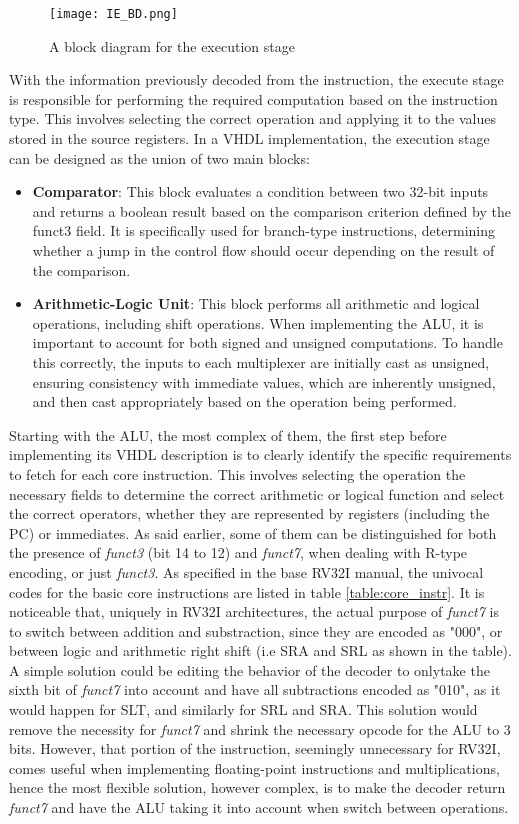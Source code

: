 \begin{figure}[ht]
    \centering
    \texttt{[image: IE\_BD.png]}
    \caption{A block diagram for the execution stage}
    \label{fig:IE_BD}
\end{figure}

With the information previously decoded from the instruction, the execute stage is responsible for performing the required computation based on the instruction type. This involves selecting the correct operation and applying it to the values stored in the source registers. In a VHDL implementation, the execution stage can be designed as the union of two main blocks: 
\begin{itemize}
\item \textbf{Comparator}: This block evaluates a condition between two 32-bit inputs and returns a boolean result based on the comparison criterion defined by the funct3 field. It is specifically used for branch-type instructions, determining whether a jump in the control flow should occur depending on the result of the comparison.
\item \textbf{Arithmetic-Logic Unit}: This block performs all arithmetic and logical operations, including shift operations. When implementing the ALU, it is important to account for both signed and unsigned computations. To handle this correctly, the inputs to each multiplexer are initially cast as unsigned, ensuring consistency with immediate values, which are inherently unsigned, and then cast appropriately based on the operation being performed.
\end{itemize}
Starting with the ALU, the most complex of them, the first step before implementing its VHDL description is to clearly identify the specific requirements to fetch for each core instruction. This involves selecting the operation the necessary fields to determine the correct arithmetic or logical function and select the correct operators, whether they are represented by registers (including the PC) or immediates. As said earlier, some of them can be distinguished for both the presence of \emph{funct3} (bit 14 to 12) and \emph{funct7}, when dealing with R-type encoding, or just \emph{funct3}. As specified in the base RV32I manual, the univocal codes for the basic core instructions are listed in table \ref{table:core_instr}. It is noticeable that, uniquely in RV32I architectures, the actual purpose of \emph{funct7} is to switch between addition and substraction, since they are encoded as "000", or between logic and arithmetic right shift (i.e SRA and SRL as shown in the table). A simple solution could be editing the behavior of the decoder to onlytake the sixth bit of \emph{funct7} into account and have all subtractions encoded as "010", as it would happen for SLT, and similarly for SRL and SRA. This solution would remove the necessity for \emph{funct7} and shrink the necessary opcode for the ALU to 3 bits. However, that portion of the instruction, seemingly unnecessary for RV32I, comes useful when implementing floating-point instructions and multiplications, hence the most flexible solution, however complex, is to make the decoder return \emph{funct7} and have the ALU taking it into account when switch between operations.

